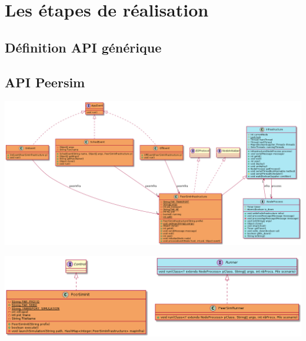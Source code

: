\documentclass{article}
\begin{document}
		\section{Les étapes de réalisation}			
			\subsection{Définition API générique}
			\subsection*{API Peersim}
			\vspace{5mm}
			\hspace*{-2.2cm} \includegraphics[width=20cm]{uml/uml_peersim_1.png}

			\vspace{20mm}
			\hspace*{-2.2cm} \includegraphics[width=20cm]{uml/uml_peersim_2.png}

			\newpage
\end{document}
